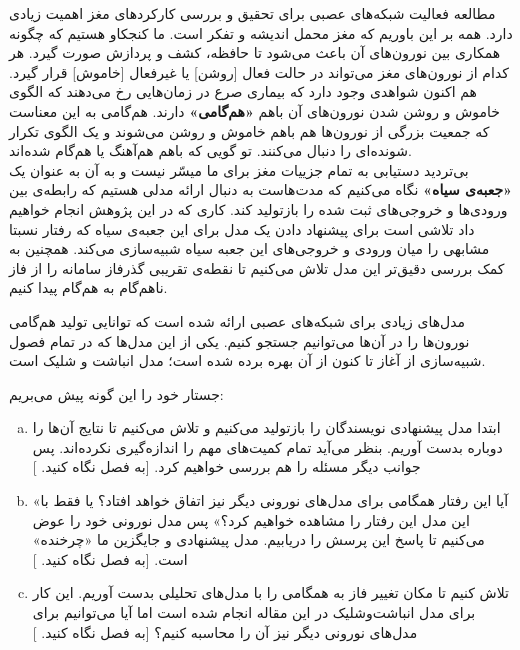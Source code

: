 مطالعه فعالیت شبکه‌های عصبی برای تحقیق و بررسی کارکردهای مغز اهمیت زیادی دارد. همه بر این باوریم که مغز محمل اندیشه و تفکر است. ما کنجکاو هستیم که چگونه همکاری بین نورون‌های آن باعث می‌شود تا حافظه، کشف و پردازش صورت گیرد. هر کدام از نورون‌های مغز می‌تواند در حالت فعال [روشن] یا غیرفعال [خاموش] قرار گیرد. هم اکنون شواهدی وجود دارد که بیماری صرع در زمان‌هایی رخ می‌دهند که الگوی خاموش و روشن شدن نورون‌های آن باهم \textbf{«هم‌گامی»} دارند. هم‌گامی به این معناست که جمعیت بزرگی از نورون‌ها هم باهم خاموش و روشن می‌شوند و یک الگوی تکرار شونده‌ای را دنبال می‌کنند. تو گویی که باهم هم‌آهنگ یا هم‌گام شده‌اند.\\

بی‌تردید دستیابی به تمام جزییات مغز برای ما میسّر نیست و به آن به عنوان یک \textbf{«جعبه‌ی سیاه»} نگاه می‌کنیم که مدت‌هاست به دنبال ارائه مدلی هستیم که رابطه‌ی بین ورودی‌ها و خروجی‌های ثبت شده را بازتولید کند.  کاری که در این پژوهش انجام خواهیم داد تلاشی است برای پیشنهاد دادن یک مدل برای این جعبه‌ی سیاه که رفتار نسبتا مشابهی را میان ورودی و خروجی‌های این جعبه سیاه شبیه‌سازی می‌کند. همچنین به کمک بررسی دقیق‌تر این مدل تلاش می‌کنیم تا نقطه‌ی تقریبی گذرفاز سامانه را از فاز ناهم‌گام به هم‌گام پیدا کنیم.

مدل‌های زیادی برای شبکه‌های عصبی ارائه شده است که توانایی تولید هم‌گامی نورون‌ها را در آن‌ها می‌توانیم جستجو کنیم. یکی از این مدل‌ها که در تمام فصول شبیه‌سازی از آغاز تا کنون از آن بهره برده شده است؛ مدل انباشت و شلیک است\cite{brunel2007quantitative}. 

جستار خود را این گونه پیش می‌بریم:
\begin{enumerate}[(a)]
	\item
	ابتدا مدل پیشنهادی نویسندگان \cite{PhysRevLett.105.158104} را بازتولید می‌کنیم و تلاش می‌کنیم تا نتایج آن‌ها را دوباره بدست آوریم. بنظر می‌آید تمام کمیت‌های مهم را اندازه‌گیری نکرده‌اند. پس جوانب دیگر مسئله را هم بررسی خواهیم کرد. [به فصل 
	نگاه کنید.
	]
	\item 
	«آیا این رفتار همگامی برای مدل‌های نورونی دیگر نیز اتفاق خواهد افتاد؟ یا فقط با این مدل این رفتار را مشاهده خواهیم کرد؟» پس مدل نورونی خود را عوض می‌کنیم تا پاسخ این پرسش را دریابیم. مدل پیشنهادی و جایگزین ما «چرخنده» است. [به فصل 
	نگاه کنید.
	]
	\item 
	تلاش کنیم تا مکان تغییر فاز به همگامی را با مدل‌های تحلیلی بدست آوریم. این کار برای مدل انباشت‌وشلیک در این مقاله 
	\cite{brunel2000dynamics}
	انجام شده است اما آیا می‌توانیم برای مدل‌های نورونی دیگر نیز آن را محاسبه کنیم؟ [به فصل 
	نگاه کنید.
	]
\end{enumerate}
